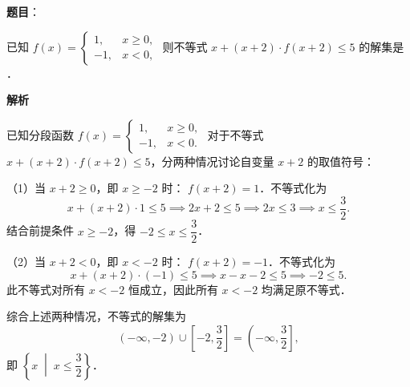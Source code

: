 \begin{answer}

\textbf{题目}：

已知 $f(x) = \begin{cases} 1, & x \geqslant 0, \\ -1, & x < 0, \end{cases}$ 则不等式 $x + (x + 2) \cdot f(x + 2) \leqslant 5$ 的解集是 \underline{\hspace{3cm}}．

\textbf{解析}

已知分段函数 $f(x) = \begin{cases} 1, & x \geqslant 0, \\ -1, & x < 0. \end{cases}$
对于不等式 $x + (x + 2) \cdot f(x + 2) \leqslant 5$，分两种情况讨论自变量 $x + 2$ 的取值符号：

（1）当 $x + 2 \geqslant 0$，即 $x \geqslant -2$ 时：
$f(x + 2) = 1$．不等式化为
\nopagebreak[4]
\[
x + (x + 2) \cdot 1 \leqslant 5 \implies 2x + 2 \leqslant 5 \implies 2x \leqslant 3 \implies x \leqslant \frac{3}{2}.
\]
结合前提条件 $x \geqslant -2$，得 $-2 \leqslant x \leqslant \dfrac{3}{2}$．

（2）当 $x + 2 < 0$，即 $x < -2$ 时：
$f(x + 2) = -1$．不等式化为
\nopagebreak[4]
\[
x + (x + 2) \cdot (-1) \leqslant 5 \implies x - x - 2 \leqslant 5 \implies -2 \leqslant 5.
\]
此不等式对所有 $x < -2$ 恒成立，因此所有 $x < -2$ 均满足原不等式．

综合上述两种情况，不等式的解集为
\nopagebreak[4]
\[
(-\infty, -2) \cup \left[-2, \frac{3}{2}\right] = \left(-\infty, \frac{3}{2}\right],
\]
即 $\left\{x \;\middle|\; x \leqslant \dfrac{3}{2}\right\}$．

\gkanswer{答案：$\left(-\infty, \dfrac{3}{2}\right]$（或 $\{x \mid x \leqslant \dfrac{3}{2}\}$）}

\end{answer}
